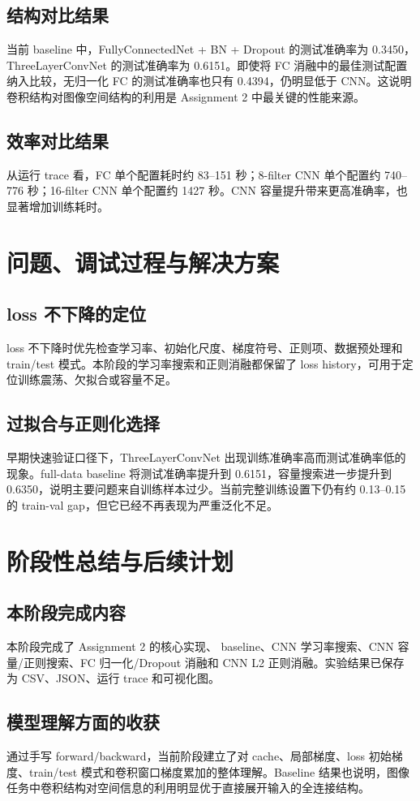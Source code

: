 \documentclass[UTF8]{ctexart}
\begin{document}
\subsection{结构对比结果}

当前 baseline 中，FullyConnectedNet + BN + Dropout 的测试准确率为 0.3450，ThreeLayerConvNet 的测试准确率为 0.6151。即使将 FC 消融中的最佳测试配置纳入比较，无归一化 FC 的测试准确率也只有 0.4394，仍明显低于 CNN。这说明卷积结构对图像空间结构的利用是 Assignment 2 中最关键的性能来源。

\subsection{效率对比结果}

从运行 trace 看，FC 单个配置耗时约 83--151 秒；8-filter CNN 单个配置约 740--776 秒；16-filter CNN 单个配置约 1427 秒。CNN 容量提升带来更高准确率，也显著增加训练耗时。

\section{问题、调试过程与解决方案}


\subsection{loss 不下降的定位}

loss 不下降时优先检查学习率、初始化尺度、梯度符号、正则项、数据预处理和 train/test 模式。本阶段的学习率搜索和正则消融都保留了 loss history，可用于定位训练震荡、欠拟合或容量不足。

\subsection{过拟合与正则化选择}

早期快速验证口径下，ThreeLayerConvNet 出现训练准确率高而测试准确率低的现象。full-data baseline 将测试准确率提升到 0.6151，容量搜索进一步提升到 0.6350，说明主要问题来自训练样本过少。当前完整训练设置下仍有约 0.13--0.15 的 train-val gap，但它已经不再表现为严重泛化不足。

\section{阶段性总结与后续计划}

\subsection{本阶段完成内容}

本阶段完成了 Assignment 2 的核心实现、 baseline、CNN 学习率搜索、CNN 容量/正则搜索、FC 归一化/Dropout 消融和 CNN L2 正则消融。实验结果已保存为 CSV、JSON、运行 trace 和可视化图。

\subsection{模型理解方面的收获}

通过手写 forward/backward，当前阶段建立了对 cache、局部梯度、loss 初始梯度、train/test 模式和卷积窗口梯度累加的整体理解。Baseline 结果也说明，图像任务中卷积结构对空间信息的利用明显优于直接展开输入的全连接结构。
\end{document}
